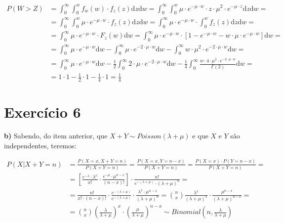 \documentclass[12pt,letterpaper]{article}
\begin{document}
	\begin{equation*}
		\begin{split}
			P(W>Z) & = \int_{0}^{\infty} \int_{0}^{w} f_w(w) \cdot f_z(z) \text{d}z \text{d}w = \int_{0}^{\infty} \int_{0}^{w} \mu \cdot e^{-\mu \cdot w} \cdot z \cdot \mu^2 \cdot e^{-\mu \cdot z} \text{d}z \text{d}w = \\
			& = \int_{0}^{\infty} \int_{0}^{w} \mu \cdot e^{-\mu \cdot w} \cdot f_z(z) \text{d}z \text{d}w = \int_{0}^{\infty} \mu \cdot e^{-\mu \cdot w} \cdot \int_{0}^{w} f_z(z) \text{d}z \text{d}w = \\
			& = \int_{0}^{\infty} \mu \cdot e^{-\mu \cdot w} \cdot F_z(w) \text{d}w = \int_{0}^{\infty} \mu \cdot e^{-\mu \cdot w} \cdot [1 -e^{-\mu \cdot w} - w \cdot \mu \cdot e^{-\mu \cdot w} ] \text{d}w = \\
			& = \int_{0}^{\infty} \mu \cdot e^{-\mu \cdot w} \text{d}w - \int_{0}^{\infty} \mu \cdot e^{-2 \cdot\mu \cdot w} \text{d}w - \int_{0}^{\infty} w \cdot \mu^2 \cdot e^{-2 \cdot \mu \cdot w} \text{d}w  = \\
			& = \int_{0}^{\infty} \mu \cdot e^{-\mu \cdot w} \text{d}w - \frac{1}{2} \int_{0}^{\infty} 2\cdot \mu \cdot e^{-2 \cdot\mu \cdot w} \text{d}w - \frac{1}{4}\int_{0}^{\infty} \frac{w \cdot 4 \cdot \mu^2 \cdot e^{-2 \cdot \mu \cdot w}}{\Gamma(2)} \text{d}w = \\
			& = 1 \cdot 1 - \frac{1}{2} \cdot 1 - \frac{1}{4} \cdot 1 = \frac{1}{4}
		\end{split}
	\end{equation*}
	
	\section*{Exercício 6}
	
	\textbf{b)} Sabendo, do item anterior, que $X+Y \sim Poisson(\lambda + \mu)$ e que $X$ e $Y$ são independentes, teremos: 
	
	\begin{equation*}
		\begin{split}
			P(X|X+Y=n) & = \frac{P(X=x, X+Y=n)}{P(X+Y=n)} = \frac{P(X=x, Y=n-x)}{P(X+Y=n)} = \frac{P(X=x) \cdot P(Y=n-x)}{P(X+Y=n)} =\\
			& = \left[\frac{e^{-\lambda} \cdot \lambda^x}{x!} \cdot \frac{e^{-\mu} \cdot \mu^{n-x}}{(n-x)!}\right] \cdot \frac{n!}{e^{-(\lambda+\mu)}\cdot(\lambda+\mu)^n} = \\
			& = \frac{n!}{x!\cdot(n-x)!} \cdot \frac{e^{-(\lambda+\mu)}}{e^{-(\lambda+\mu)}} \cdot \frac{\lambda^x \cdot \mu^{n-x}}{(\lambda+\mu)^n} = \binom{n}{x} \frac{\lambda^x}{(\lambda+\mu)^x} \cdot \frac{\mu^{n-x}}{(\lambda+\mu)^{n-x}} = \\
			& = \binom{n}{x} \left(\frac{\lambda}{\lambda+\mu}\right)^x \cdot \left(\frac{\mu}{\lambda+\mu}\right)^{n-x} \sim Binomial\left(n, \frac{\lambda}{\lambda+\mu}\right)\\
		\end{split}
	\end{equation*}
	
\end{document}
